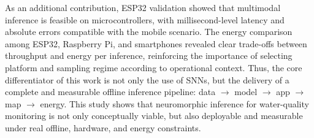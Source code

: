 As an additional contribution, ESP32 validation showed that multimodal inference is feasible on
microcontrollers, with millisecond-level latency and absolute errors compatible with the mobile
scenario. The energy comparison among ESP32, Raspberry Pi, and smartphones revealed clear
trade-offs between throughput and energy per inference, reinforcing the importance of selecting
platform and sampling regime according to operational context. Thus, the core differentiator of
this work is not only the use of SNNs, but the delivery of a complete and measurable offline
inference pipeline: data \(\rightarrow\) model \(\rightarrow\) app \(\rightarrow\) map \(\rightarrow\) energy.
This study shows that neuromorphic inference for water-quality monitoring is not only
conceptually viable, but also deployable and measurable under real offline, hardware, and
energy constraints.
